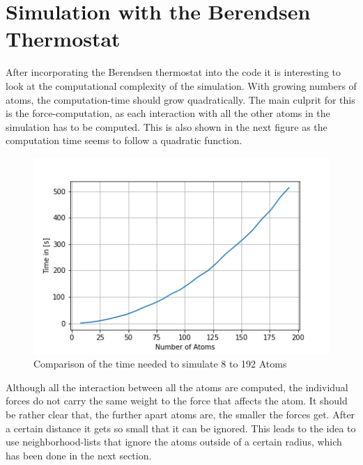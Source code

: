 \section{Simulation with the Berendsen Thermostat}

After incorporating the Berendsen thermostat into the code it is interesting to look at the computational complexity of the simulation. With growing numbers of atoms, the computation-time should grow quadratically. The main culprit for this is the force-computation, as each interaction with all the other atoms in the simulation has to be computed. This is also shown in the next figure as the computation time seems to follow a quadratic function. 
\begin{figure}
	\begin{center}
		\includegraphics[scale=1]{Figure/plotAtomTimes.png}
	\end{center}
	\caption[Comparison of the time needed to simulate 8 to 192 Atoms]{Comparison of the time needed to simulate 8 to 192 Atoms}
	\label{PlotSimulationTimeBerendsenThermostat}
\end{figure}
Although all the interaction between all the atoms are computed, the individual forces do not carry the same weight to the force that affects the atom. It should be rather clear that, the further apart atoms are, the smaller the forces get. After a certain distance it gets so small that it can be ignored. This leads to the idea to use neighborhood-lists that ignore the atoms outside of a certain radius, which has been done in the next section.

